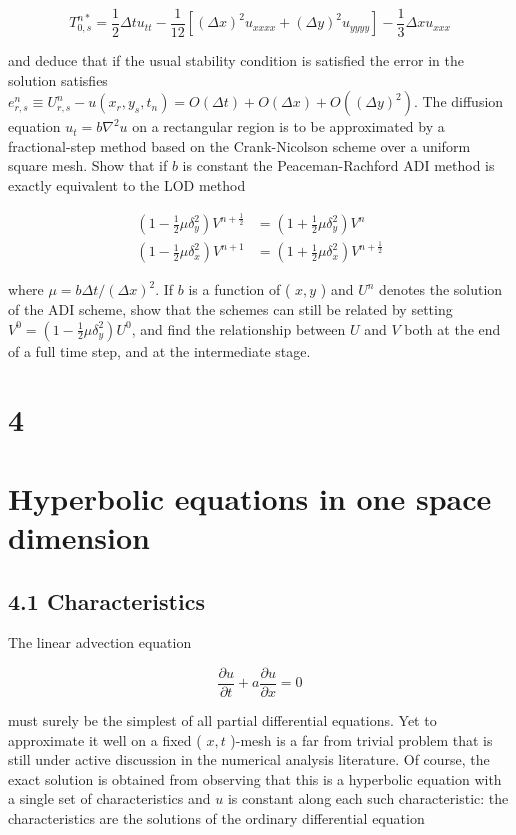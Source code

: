 \documentclass[10pt]{article}
\begin{document}
\[
T_{0, s}^{n *}=\frac{1}{2} \Delta t u_{t t}-\frac{1}{12}\left[(\Delta x)^{2} u_{x x x x}+(\Delta y)^{2} u_{y y y y}\right]-\frac{1}{3} \Delta x u_{x x x}
\]

and deduce that if the usual stability condition is satisfied the error in the solution satisfies \(e_{r, s}^{n} \equiv U_{r, s}^{n}-u\left(x_{r}, y_{s}, t_{n}\right)=O(\Delta t)+ O(\Delta x)+O\left((\Delta y)^{2}\right)\). The diffusion equation \(u_{t}=b \nabla^{2} u\) on a rectangular region is to be approximated by a fractional-step method based on the Crank-Nicolson scheme over a uniform square mesh. Show that if \(b\) is constant the Peaceman-Rachford ADI method is exactly equivalent to the LOD method

\[
\begin{aligned}
\left(1-\frac{1}{2} \mu \delta_{y}^{2}\right) V^{n+\frac{1}{2}} & =\left(1+\frac{1}{2} \mu \delta_{y}^{2}\right) V^{n} \\
\left(1-\frac{1}{2} \mu \delta_{x}^{2}\right) V^{n+1} & =\left(1+\frac{1}{2} \mu \delta_{x}^{2}\right) V^{n+\frac{1}{2}}
\end{aligned}
\]

where \(\mu=b \Delta t /(\Delta x)^{2}\). If \(b\) is a function of ( \(x, y\) ) and \(U^{n}\) denotes the solution of the ADI scheme, show that the schemes can still be related by setting \(V^{0}=\left(1-\frac{1}{2} \mu \delta_{y}^{2}\right) U^{0}\), and find the relationship between \(U\) and \(V\) both at the end of a full time step, and at the intermediate stage.

\section*{4}
\section*{Hyperbolic equations in one space dimension}
\subsection*{4.1 Characteristics}
The linear advection equation

\[
\frac{\partial u}{\partial t}+a \frac{\partial u}{\partial x}=0
\]

must surely be the simplest of all partial differential equations. Yet to approximate it well on a fixed ( \(x, t\) )-mesh is a far from trivial problem that is still under active discussion in the numerical analysis literature. Of course, the exact solution is obtained from observing that this is a hyperbolic equation with a single set of characteristics and \(u\) is constant along each such characteristic: the characteristics are the solutions of the ordinary differential equation
\end{document}
